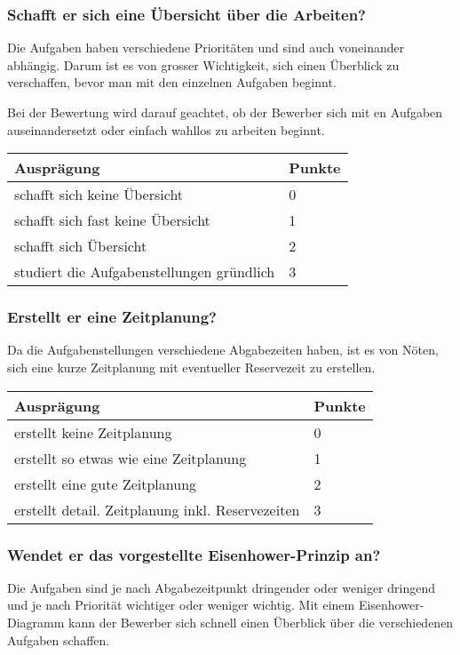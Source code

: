 \subsubsection{Schafft er sich eine Übersicht über die Arbeiten?}
Die Aufgaben haben verschiedene Prioritäten und sind auch voneinander abhängig. Darum ist es von grosser Wichtigkeit, sich einen Überblick zu verschaffen, bevor man mit den einzelnen Aufgaben beginnt.

Bei der Bewertung wird darauf geachtet, ob der Bewerber sich mit en Aufgaben auseinandersetzt oder einfach wahllos zu arbeiten beginnt.

\begin{center}
  \begin{tabular}{ | p{6.5cm} | p{1cm} |}
   \hline
   \textbf{Ausprägung} & \textbf{Punkte} \\ \hline
   schafft sich keine Übersicht & 0 \\ \hline
   schafft sich fast keine Übersicht & 1 \\ \hline
   schafft sich Übersicht & 2 \\ \hline
   studiert die Aufgabenstellungen gründlich  & 3\\ \hline
  \end{tabular}
\end{center}

\subsubsection{Erstellt er eine Zeitplanung?}
Da die Aufgabenstellungen verschiedene Abgabezeiten haben, ist es von Nöten, sich eine kurze Zeitplanung mit eventueller Reservezeit zu erstellen.


\begin{center}
  \begin{tabular}{ | p{7cm} | p{1cm} |}
   \hline
   \textbf{Ausprägung} & \textbf{Punkte} \\ \hline
   erstellt keine Zeitplanung & 0 \\ \hline
   erstellt so etwas wie eine Zeitplanung & 1 \\ \hline
   erstellt eine gute Zeitplanung & 2 \\ \hline
   erstellt detail. Zeitplanung inkl. Reservezeiten  & 3\\ \hline
  \end{tabular}
\end{center}

\subsubsection{Wendet er das vorgestellte Eisenhower-Prinzip an?}
Die Aufgaben sind je nach Abgabezeitpunkt dringender oder weniger dringend und je nach Priorität wichtiger oder weniger wichtig. Mit einem Eisenhower-Diagramm kann der Bewerber sich schnell einen Überblick über die verschiedenen Aufgaben schaffen.

